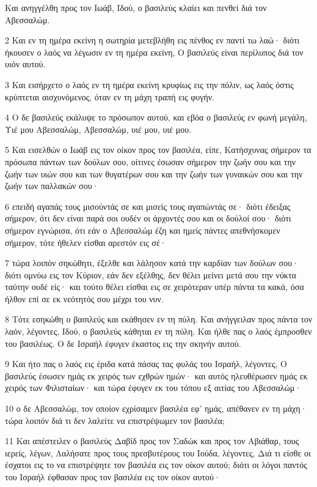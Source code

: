 \par Και ανηγγέλθη προς τον Ιωάβ, Ιδού, ο βασιλεύς κλαίει και πενθεί διά τον Αβεσσαλώμ.
\par 2 Και εν τη ημέρα εκείνη η σωτηρία μετεβλήθη εις πένθος εν παντί τω λαώ· διότι ήκουσεν ο λαός να λέγωσιν εν τη ημέρα εκείνη, Ο βασιλεύς είναι περίλυπος διά τον υιόν αυτού.
\par 3 Και εισήρχετο ο λαός εν τη ημέρα εκείνη κρυφίως εις την πόλιν, ως λαός όστις κρύπτεται αισχυνόμενος, όταν εν τη μάχη τραπή εις φυγήν.
\par 4 Ο δε βασιλεύς εκάλυψε το πρόσωπον αυτού, και εβόα ο βασιλεύς εν φωνή μεγάλη, Υιέ μου Αβεσσαλώμ, Αβεσσαλώμ, υιέ μου, υιέ μου.
\par 5 Και εισελθών ο Ιωάβ εις τον οίκον προς τον βασιλέα, είπε, Κατήσχυνας σήμερον τα πρόσωπα πάντων των δούλων σου, οίτινες έσωσαν σήμερον την ζωήν σου και την ζωήν των υιών σου και των θυγατέρων σου και την ζωήν των γυναικών σου και την ζωήν των παλλακών σου·
\par 6 επειδή αγαπάς τους μισούντάς σε και μισείς τους αγαπώντάς σε· διότι έδειξας σήμερον, ότι δεν είναι παρά σοι ουδέν οι άρχοντές σου και οι δούλοί σου· διότι σήμερον εγνώρισα, ότι εάν ο Αβεσσαλώμ έζη και ημείς πάντες απεθνήσκομεν σήμερον, τότε ήθελεν είσθαι αρεστόν εις σέ·
\par 7 τώρα λοιπόν σηκώθητι, έξελθε και λάλησον κατά την καρδίαν των δούλων σου· διότι ομνύω εις τον Κύριον, εάν δεν εξέλθης, δεν θέλει μείνει μετά σου την νύκτα ταύτην ουδέ είς· και τούτο θέλει είσθαι εις σε χειρότεραν υπέρ πάντα τα κακά, όσα ήλθον επί σε εκ νεότητός σου μέχρι του νυν.
\par 8 Τότε εσηκώθη ο βασιλεύς και εκάθησεν εν τη πύλη. Και ανήγγειλαν προς πάντα τον λαόν, λέγοντες, Ιδού, ο βασιλεύς κάθηται εν τη πύλη. Και ήλθε πας ο λαός έμπροσθεν του βασιλέως. Ο δε Ισραήλ έφυγεν έκαστος εις την σκηνήν αυτού.
\par 9 Και ήτο πας ο λαός εις έριδα κατά πάσας τας φυλάς του Ισραήλ, λέγοντες, Ο βασιλεύς έσωσεν ημάς εκ χειρός των εχθρών ημών· και αυτός ηλευθέρωσεν ημάς εκ χειρός των Φιλισταίων· και τώρα έφυγεν εκ του τόπου εξ αιτίας του Αβεσσαλώμ·
\par 10 ο δε Αβεσσαλώμ, τον οποίον εχρίσαμεν βασιλέα εφ' ημάς, απέθανεν εν τη μάχη· τώρα λοιπόν διά τι δεν λαλείτε να επιστρέψωμεν τον βασιλέα;
\par 11 Και απέστειλεν ο βασιλεύς Δαβίδ προς τον Σαδώκ και προς τον Αβιάθαρ, τους ιερείς, λέγων, Λαλήσατε προς τους πρεσβυτέρους του Ιούδα, λέγοντες, Διά τι είσθε οι έσχατοι εις το να επιστρέψητε τον βασιλέα εις τον οίκον αυτού; διότι οι λόγοι παντός του Ισραήλ έφθασαν προς τον βασιλέα εις τον οίκον αυτού·
